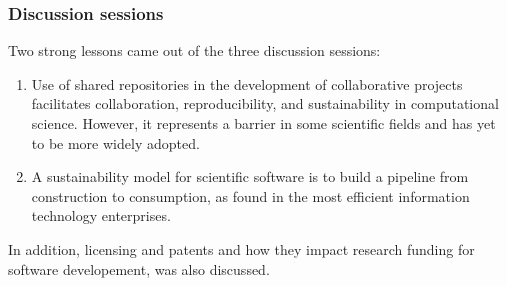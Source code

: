 \documentclass[11pt, oneside]{amsart}
\newcommand{\note}[1]{ {\textcolor{red}    { #1 }}}
\begin{document}
\subsubsection*{Discussion sessions}

Two strong lessons came out of the three discussion sessions:

\begin{enumerate}
\item Use of shared repositories in the development of collaborative
  projects facilitates collaboration, reproducibility, and
  sustainability in computational science. However, it represents a
  barrier in some scientific fields and has yet to be more widely
  adopted.




\item A sustainability model for scientific software is to build a
  pipeline from construction to consumption, as found in the most
  efficient information technology enterprises.

\end{enumerate}
In addition, licensing and patents and how they impact research funding
for software developement, was also discussed.
\end{document}
